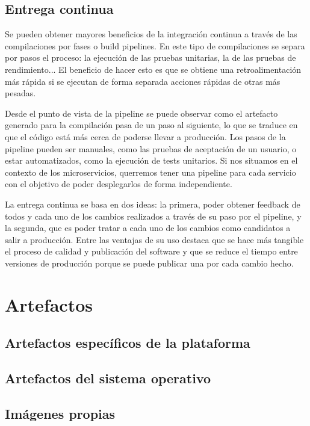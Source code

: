 \documentclass[11pt,a4paper]{article}
\begin{document}
\subsection{Entrega continua}

Se pueden obtener mayores beneficios de la integración continua a través de las compilaciones por fases o build pipelines. En este tipo de compilaciones se separa por pasos el proceso: la ejecución de las pruebas unitarias, la de las pruebas de rendimiento... El beneficio de hacer esto es que se obtiene una retroalimentación más rápida si se ejecutan de forma separada acciones rápidas de otras más pesadas.

Desde el punto de vista de la pipeline se puede observar como el artefacto generado para la compilación pasa de un paso al siguiente, lo que se traduce en que el código está más cerca de poderse llevar a producción. Los pasos de la pipeline pueden ser manuales, como las pruebas de aceptación de un usuario, o estar automatizados, como la ejecución de tests unitarios. Si nos situamos en el contexto de los microservicios, querremos tener una pipeline para cada servicio con el objetivo de poder desplegarlos de forma independiente.

La entrega continua se basa en dos ideas: la primera, poder obtener feedback de todos y cada uno de los cambios realizados a través de su paso por el pipeline, y la segunda, que es poder tratar a cada uno de los cambios como candidatos a salir a producción. Entre las ventajas de su uso destaca que se hace más tangible el proceso de calidad y publicación del software y que se reduce el tiempo entre versiones de producción porque se puede publicar una por cada cambio hecho.

\section{Artefactos}

\subsection{Artefactos específicos de la plataforma}

\subsection{Artefactos del sistema operativo}

\subsection{Imágenes propias}
\end{document}
